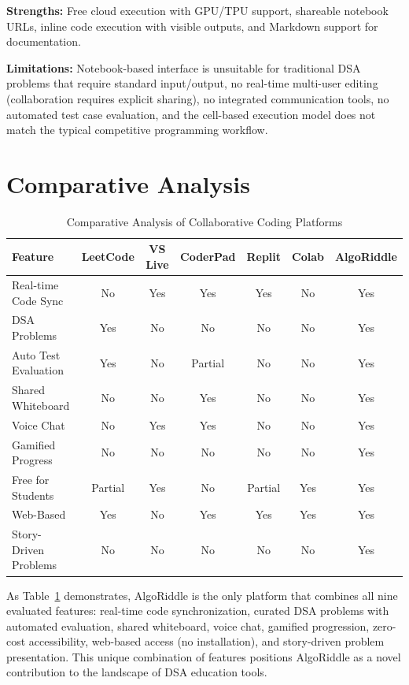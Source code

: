 \textbf{Strengths:} Free cloud execution with GPU/TPU support, shareable notebook URLs, inline code execution with visible outputs, and Markdown support for documentation.

\textbf{Limitations:} Notebook-based interface is unsuitable for traditional DSA problems that require standard input/output, no real-time multi-user editing (collaboration requires explicit sharing), no integrated communication tools, no automated test case evaluation, and the cell-based execution model does not match the typical competitive programming workflow.

\section{Comparative Analysis}

\begin{table}[H]
\centering
\caption{Comparative Analysis of Collaborative Coding Platforms}
\label{tab:comparison}
\begin{reporttable}
\begin{tabular}{@{} l c c c c c c @{}}
\toprule
\textbf{Feature} & \textbf{LeetCode} & \textbf{VS Live} & \textbf{CoderPad} & \textbf{Replit} & \textbf{Colab} & \textbf{AlgoRiddle} \\
\midrule
Real-time Code Sync & No & Yes & Yes & Yes & No & Yes \\
DSA Problems & Yes & No & No & No & No & Yes \\
Auto Test Evaluation & Yes & No & Partial & No & No & Yes \\
Shared Whiteboard & No & No & Yes & No & No & Yes \\
Voice Chat & No & Yes & Yes & No & No & Yes \\
Gamified Progress & No & No & No & No & No & Yes \\
Free for Students & Partial & Yes & No & Partial & Yes & Yes \\
Web-Based & Yes & No & Yes & Yes & Yes & Yes \\
Story-Driven Problems & No & No & No & No & No & Yes \\
\bottomrule
\end{tabular}
\end{reporttable}
\end{table}

As Table~\ref{tab:comparison} demonstrates, AlgoRiddle is the only platform that combines all nine evaluated features: real-time code synchronization, curated DSA problems with automated evaluation, shared whiteboard, voice chat, gamified progression, zero-cost accessibility, web-based access (no installation), and story-driven problem presentation. This unique combination of features positions AlgoRiddle as a novel contribution to the landscape of DSA education tools.

